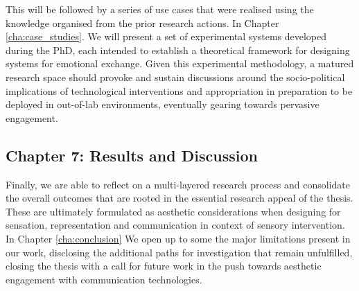 This will be followed by a series of use cases that were realised using the knowledge organised from the prior research actions. In Chapter \ref{cha:case_studies}. We will present a set of experimental systems developed during the PhD, each intended to establish a theoretical framework for designing systems for emotional exchange. Given this experimental methodology, a matured research space should provoke and sustain discussions around the socio-political implications of technological interventions and appropriation in preparation to be deployed in out-of-lab environments, eventually gearing towards pervasive engagement.

\subsection{Chapter 7: Results and Discussion}

Finally, we are able to reflect on a multi-layered research process and consolidate the overall outcomes that are rooted in the essential research appeal of the thesis. These are ultimately formulated as aesthetic considerations when designing for sensation, representation and communication in context of sensory intervention. In Chapter \ref{cha:conclusion} We open up to some the major limitations present in our work, disclosing the additional paths for investigation that remain unfulfilled, closing the thesis with a call for future work in the push towards aesthetic engagement with communication technologies. 

